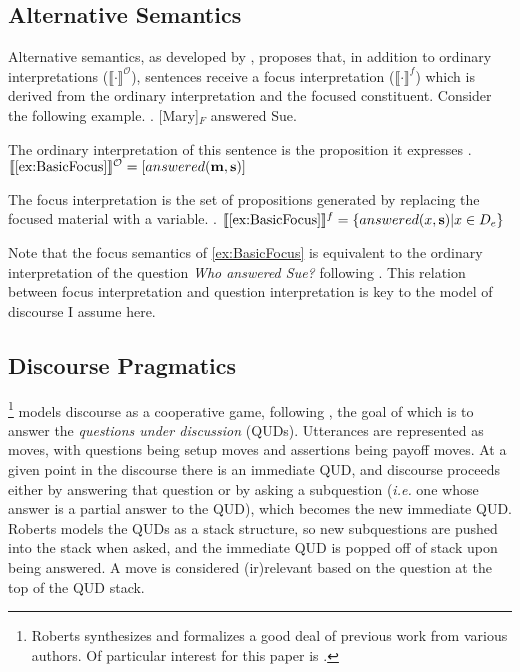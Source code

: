 \documentclass[
	letterpaper,
]{article}
\begin{document}
\subsection{Alternative Semantics \parencite{rooth1992theory}}\label{sec:rooth}
Alternative semantics, as developed by \textcite{rooth1992theory}, proposes that, in addition to ordinary interpretations ($\llbracket\cdot\rrbracket^\mathcal{O}$), sentences receive a focus interpretation ($\llbracket\cdot\rrbracket^f$) which is derived from the ordinary interpretation and the focused constituent.
Consider the following example.
\ex.\label{ex:BasicFocus} [Mary]$_F$ answered Sue.

The ordinary interpretation of this sentence is the proposition it expresses
\ex.\label{ex:OrdinaryInterpretation} $\llbracket\ref{ex:BasicFocus}\rrbracket^\mathcal{O} = [answered(\mathbf{m}, \mathbf{s})]$

The focus interpretation is the set of propositions generated by replacing the focused material with a variable.
\ex.\label{ex:FocusInterpretation} $\llbracket\ref{ex:BasicFocus}\rrbracket^f = \left\{ answered(x, \mathbf{s}) | x \in D_e \right\}$

Note that the focus semantics of \ref{ex:BasicFocus} is equivalent to the ordinary interpretation of the question \textit{Who answered Sue?} following \textcite{hamblin1973questions}. 
This relation between focus interpretation and question interpretation is key to the model of discourse I assume here.

\subsection{Discourse Pragmatics \parencite{roberts2012information}}\label{sec:roberts}
\textcite{roberts2012information}\footnote{
	Roberts synthesizes and formalizes a good deal of previous work from various authors.
	Of particular interest for this paper is \textcite{rooth1992theory,krifka1992compositional,stechow1991focusing,jackendoff1972semantics}.
} models discourse as a cooperative game, following \textcite{lewis1979scorekeeping}, the goal of which is to answer the \textit{questions under discussion} (QUDs).
Utterances are represented as moves, with questions being setup moves and assertions being payoff moves.
At a given point in the discourse there is an immediate QUD, and discourse proceeds either by answering that question or by asking a subquestion (\textit{i.e.} one whose answer is a partial answer to the QUD), which becomes the new immediate QUD.
Roberts models the QUDs as a stack structure, so new subquestions are pushed into the stack when asked, and the immediate QUD is popped off of stack upon being answered.
A move is considered (ir)relevant based on the question at the top of the QUD stack.
\end{document}
